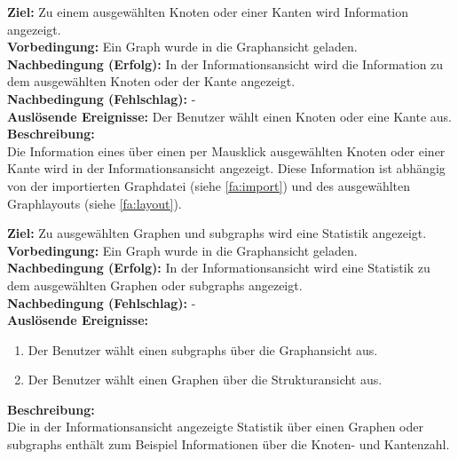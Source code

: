 \label{fa:infoanzeige}
\textbf{Ziel:} Zu einem ausgewählten Knoten oder einer Kanten wird Information angezeigt.\\
\textbf{Vorbedingung:} Ein Graph wurde in die Graphansicht geladen.\\
\textbf{Nachbedingung (Erfolg):} In der Informationsansicht wird die Information zu dem ausgewählten Knoten oder der Kante angezeigt.\\
\textbf{Nachbedingung (Fehlschlag):} -\\
\textbf{Auslösende Ereignisse:} Der Benutzer wählt einen Knoten oder eine Kante aus.\\
\textbf{Beschreibung:}\\
Die Information eines über einen per Mausklick ausgewählten Knoten oder einer Kante wird in der Informationsansicht angezeigt. Diese Information ist abhängig von der importierten Graphdatei (siehe \ref{fa:import}) und des ausgewählten Graphlayouts (siehe \ref{fa:layout}).

\label{fa:statistik}
\textbf{Ziel:} Zu ausgewählten Graphen und \glspl{subgraph} wird eine Statistik angezeigt.\\
\textbf{Vorbedingung:} Ein Graph wurde in die Graphansicht geladen.\\
\textbf{Nachbedingung (Erfolg):} In der Informationsansicht wird eine Statistik zu dem ausgewählten Graphen oder \glspl{subgraph} angezeigt.\\
\textbf{Nachbedingung (Fehlschlag):} -\\
\textbf{Auslösende Ereignisse:}
\begin{enumerate}[nolistsep, label=(\alph*)]
  \item Der Benutzer wählt einen \glspl{subgraph} über die Graphansicht aus.
  \item Der Benutzer wählt einen Graphen über die Strukturansicht aus.
\end{enumerate}
\textbf{Beschreibung:}\\
Die in der Informationsansicht angezeigte Statistik über einen Graphen oder \glspl{subgraph} enthält zum Beispiel Informationen über die Knoten- und Kantenzahl.

